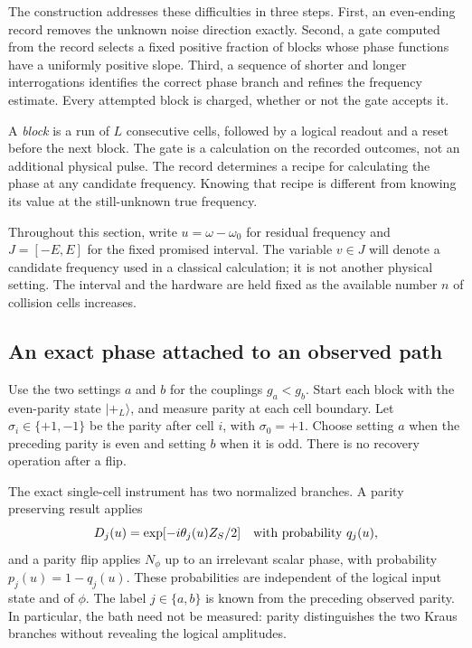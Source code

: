 \documentclass[11pt,a4paper]{article}
\numberwithin{equation}{section}
\theoremstyle{remark}
\begin{document}
The construction addresses these difficulties in three steps.  First, an
even-ending record removes the unknown noise direction exactly.  Second, a
gate computed from the record selects a fixed positive fraction of blocks
whose phase functions have a uniformly positive slope.  Third, a sequence of
shorter and longer interrogations identifies the correct phase branch and
refines the frequency estimate.  Every attempted block is charged, whether
or not the gate accepts it.

A \emph{block} is a run of $L$ consecutive cells, followed by a logical
readout and a reset before the next block.  The gate is a calculation on the
recorded outcomes, not an additional physical pulse.  The record determines
a recipe for calculating the phase at any candidate frequency.  Knowing
that recipe is different from knowing its value at the still-unknown true
frequency.

Throughout this section, write $u=\omega-\omega_0$ for residual frequency and
$J=[-E,E]$ for the fixed promised interval.  The variable $v\in J$ will denote
a candidate frequency used in a classical calculation; it is not another
physical setting.  The interval and the hardware are held fixed as the
available number $n$ of collision cells increases.

\subsection{An exact phase attached to an observed path}
\label{phase:identity}

Use the two settings $a$ and $b$ for the couplings $g_a<g_b$.  Start each block
with the even-parity state $|+_L\rangle$, and measure parity at each cell
boundary.  Let $\sigma_i\in\{+1,-1\}$ be the parity after cell $i$, with
$\sigma_0=+1$.  Choose setting $a$ when the preceding parity is even and
setting $b$ when it is odd.  There is no recovery operation after a flip.

The exact single-cell instrument has two normalized branches.  A parity
preserving result applies
\begin{equation}
 D_j(u)=\exp[-i\theta_j(u)Z_S/2]
 \quad\hbox{with probability }q_j(u),
 \label{phase:stay}
\end{equation}
and a parity flip applies $N_\phi$ up to an irrelevant scalar phase, with
probability $p_j(u)=1-q_j(u)$.  These probabilities are independent of the
logical input state and of $\phi$.  The label $j\in\{a,b\}$ is known from
the preceding observed parity.  In particular, the bath need not be
measured: parity distinguishes the two Kraus branches without revealing the
logical amplitudes.
\end{document}
